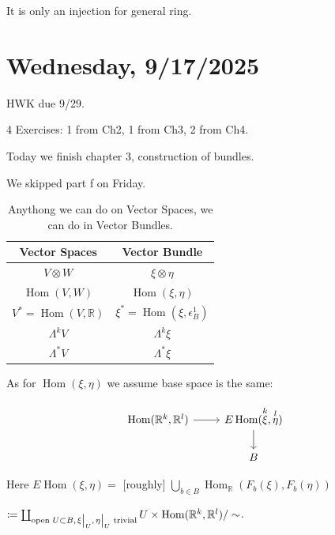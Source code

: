 \documentclass{article}
\theoremstyle{definition}
\begin{document}
    It is only an injection for general ring.

    \section*{Wednesday, 9/17/2025}
    
    HWK due 9/29.

    4 Exercises: 1 from Ch2, 1 from Ch3, 2 from Ch4.

    Today we finish chapter 3, construction of bundles.

    We skipped part f on Friday.

    \begin{table}[H]
        \centering
        \begin{tabular}{c|c}
            \toprule
                Vector Spaces & Vector Bundle \\
            \midrule
                \(V \otimes W\) & \(\xi \otimes \eta\) \\
                \(\operatorname{Hom}(V,W)\) & \(\operatorname{Hom}(\xi, \eta)\) \\
                \(V^{\ast} = \operatorname{Hom} (V,\mathbb{R})\) & \(\xi ^{\ast} = \operatorname{Hom} (\xi , \epsilon_B^1)\) \\
                \(\Lambda^k V\) & \(\Lambda ^k \xi\) \\
                \(\Lambda ^{\ast} V\) & \(\Lambda ^{\ast} \xi\)  \\
            \bottomrule
        \end{tabular}
        \caption{Anythong we can do on Vector Spaces, we can do in Vector Bundles.}
    \end{table}

    As for \(\operatorname{Hom}(\xi, \eta)\) we assume base space is the same:
    
    \[
        \begin{tikzcd}
            \operatorname{Hom}(\mathbb{R}^k, \mathbb{R}^l) \ar[r] & E \operatorname{Hom}(\overset{k}{\xi}, \overset{l}{\eta}) \ar[d] \\ & B
        \end{tikzcd}
    \]

    Here \(E \operatorname{Hom}(\xi, \eta) =\) [roughly] \(\bigcup_{b\in B} \operatorname{Hom}_{\mathbb{R}} (F_b(\xi), F_b(\eta))\)
    
    \(\coloneqq \coprod_{\text{open } U \subset B, \eval{\xi}_U, \eval{\eta}_U \text{ trivial}} U \times \operatorname{Hom}(\mathbb{R}^k, \mathbb{R}^l) / \sim\).
    
\end{document}
